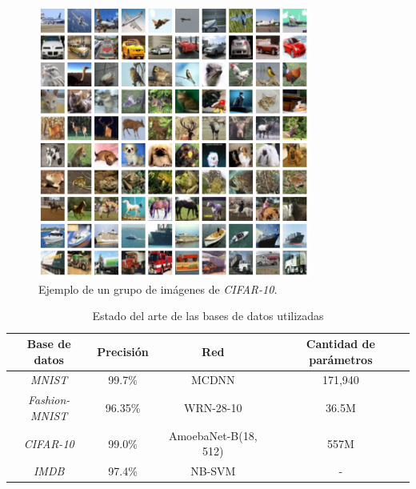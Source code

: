 \documentclass[spanish]{article}
\theoremstyle{definition}
\theoremstyle{remark}
\numberwithin{equation}{section}
\numberwithin{equation}{section} %
\begin{document}
\begin{figure}[H]
\centering
\includegraphics[width=9cm]{img/ejemplo_CIFAR-10.png}
\caption[Ejemplo \textit{CIFAR-10}]{\footnotesize{ Ejemplo de un grupo de imágenes de \textit{CIFAR-10}\cite{krizhevsky2014cifar}.}}
\label{fig:CIFAR-10}
\end{figure}
\begin{table}[h]
\centering 
\begin{tabular}{ |c|c|c|c| } 
 \hline
 Base de datos & Precisión & Red & Cantidad de parámetros \\
  \hline
 \textit{MNIST} & 99.7\% & MCDNN \cite{cirecsan2012multi}& 171,940  \\ 
 \textit{Fashion-MNIST} & 96.35\% & WRN-28-10 \cite{zhong2017random} & 36.5M  \\ 
 \textit{CIFAR-10}  & 99.0\%  & AmoebaNet-B(18, 512) \cite{huang2018gpipe} & 557M \\ 
  \textit{IMDB}  & 97.4\%  & NB-SVM \cite{thongtan2019sentiment} & - \\ 
 \hline
\end{tabular}
\caption{Estado del arte de las bases de datos utilizadas}
\label{table:EstadoDelArte}
\end{table}

\par
\end{document}

